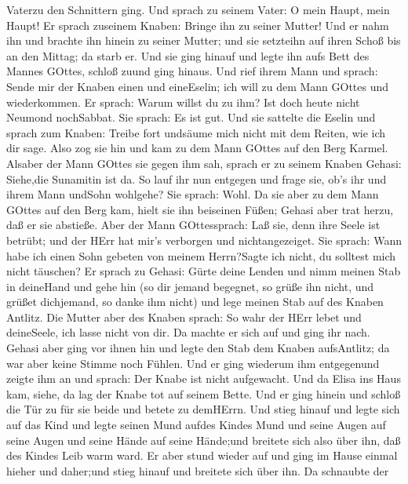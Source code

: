 Vaterzu den Schnittern ging.  Und sprach zu seinem Vater: O
mein Haupt, mein Haupt! Er sprach zuseinem Knaben: Bringe ihn zu seiner
Mutter!  Und er nahm ihn und brachte ihn hinein zu seiner
Mutter; und sie setzteihn auf ihren Schoß bis an den Mittag; da starb
er.  Und sie ging hinauf und legte ihn aufs Bett des Mannes
GOttes, schloß zuund ging hinaus.  Und rief ihrem Mann und
sprach: Sende mir der Knaben einen und eineEselin; ich will zu dem Mann
GOttes und wiederkommen.  Er sprach: Warum willst du zu
ihm? Ist doch heute nicht Neumond nochSabbat. Sie sprach: Es ist gut.
 Und sie sattelte die Eselin und sprach zum Knaben: Treibe
fort undsäume mich nicht mit dem Reiten, wie ich dir sage. 
Also zog sie hin und kam zu dem Mann GOttes auf den Berg Karmel. Alsaber
der Mann GOttes sie gegen ihm sah, sprach er zu seinem Knaben Gehasi:
Siehe,die Sunamitin ist da.  So lauf ihr nun entgegen und
frage sie, ob's ihr und ihrem Mann undSohn wohlgehe? Sie sprach: Wohl.
 Da sie aber zu dem Mann GOttes auf den Berg kam, hielt sie
ihn beiseinen Füßen; Gehasi aber trat herzu, daß er sie abstieße. Aber
der Mann GOttessprach: Laß sie, denn ihre Seele ist betrübt; und der
HErr hat mir's verborgen und nichtangezeiget.  Sie sprach:
Wann habe ich einen Sohn gebeten von meinem Herrn?Sagte ich nicht, du
solltest mich nicht täuschen?  Er sprach zu Gehasi: Gürte
deine Lenden und nimm meinen Stab in deineHand und gehe hin (so dir
jemand begegnet, so grüße ihn nicht, und grüßet dichjemand, so danke ihm
nicht) und lege meinen Stab auf des Knaben Antlitz.  Die
Mutter aber des Knaben sprach: So wahr der HErr lebet und deineSeele,
ich lasse nicht von dir. Da machte er sich auf und ging ihr nach.
 Gehasi aber ging vor ihnen hin und legte den Stab dem
Knaben aufsAntlitz; da war aber keine Stimme noch Fühlen. Und er ging
wiederum ihm entgegenund zeigte ihm an und sprach: Der Knabe ist nicht
aufgewacht.  Und da Elisa ins Haus kam, siehe, da lag der
Knabe tot auf seinem Bette.  Und er ging hinein und schloß
die Tür zu für sie beide und betete zu demHErrn.  Und stieg
hinauf und legte sich auf das Kind und legte seinen Mund aufdes Kindes
Mund und seine Augen auf seine Augen und seine Hände auf seine Hände;und
breitete sich also über ihn, daß des Kindes Leib warm ward.
 Er aber stund wieder auf und ging im Hause einmal hieher
und daher;und stieg hinauf und breitete sich über ihn. Da schnaubte der
